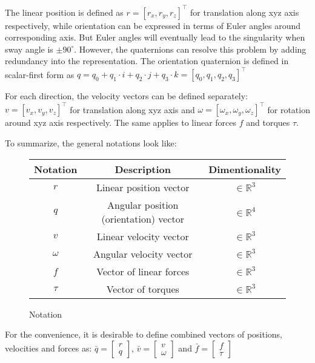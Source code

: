     The linear position is defined as $r = [r_x, r_y, r_z]^\top$ for translation along xyz axis respectively,
    while orientation can be expressed in terms of Euler angles around corresponding axis. 
    But Euler angles will eventually lead to the singularity 
    when sway angle is $± 90^{\circ}$. 
    However, the quaternions can resolve this problem by adding redundancy into the representation. 
    The orientation quaternion is defined in scalar-first form as 
    $q = q_0 + q_1\cdot i + q_2\cdot j + q_3\cdot k = [q_0, q_1, q_2, q_3]^\top$

    For each direction, the velocity vectors can be defined separately: 
    $v = [v_x, v_y, v_z]^\top$ for translation along xyz axis and
    $\omega = [\omega_x, \omega_y, \omega_z]^\top$ for rotation around xyz axis respectively.
    The same applies to linear forces $f$ and torques $\tau$.

    To summarize, the general notations look like:

    \begin{figure}[H]
    \begin{tabular}{ccc}
        \hline Notation & Description & Dimentionality\\
        \hline
        $r$ & Linear position vector & $\in \mathbb{R}^{3}$ \\
        $q$ & Angular position (orientation) vector & $\in \mathbb{R}^{4}$\\
        $v$ & Linear velocity vector & $\in \mathbb{R}^{3}$\\
        $\omega$ & Angular velocity vector & $\in \mathbb{R}^{3}$\\
        $f$ & Vector of linear forces& $\in \mathbb{R}^{3}$ \\
        $\tau$ & Vector of torques& $\in \mathbb{R}^{3}$ \\
        \hline
        \end{tabular}
        \caption{Notation}
        \label{table:notation}
    \end{figure}

    For the convenience, it is desirable to define combined vectors of positions, velocities and forces as:
    $\bar{q} = \left[\begin{array}{ll}
        r \\
        q
    \end{array}\right]$, $\bar{v} = \left[\begin{array}{ll}
        v \\
        \omega
    \end{array}\right]$ and $\bar{f} = \left[\begin{array}{ll}
        f \\
        \tau
    \end{array}\right]$


